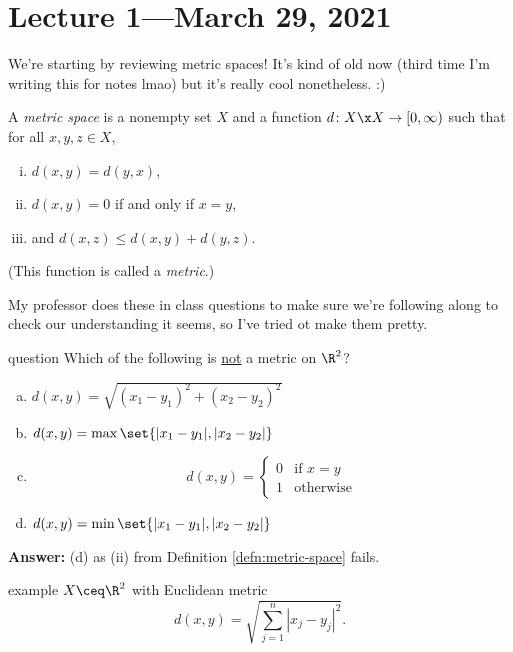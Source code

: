 \documentclass[class=article, crop=false]{standalone}
\begin{document}
\section{Lecture 1---March 29, 2021}

We're starting by reviewing metric spaces! It's kind of old now (third time I'm writing this for notes lmao) but it's really cool nonetheless. :)

\begin{defn}{\label{defn:metric-space}}
  A \emph{metric space} is a nonempty set $X$ and a function $d\colon X \x X \to [0,\infty)$ such that for all $x,y,z \in X$, \begin{enumerate}[(i)]
    \item $d(x,y) = d(y,x)$,
    \item $d(x,y) = 0$ if and only if $x=y$,
    \item and $d(x,z) \leq d(x,y)+d(y,z)$.
  \end{enumerate}
  (This function is called a \emph{metric}.)
\end{defn}

My professor does these in class questions to make sure we're following along to check our understanding it seems, so I've tried ot make them pretty.

\begin{understandingcheck}{question}
  Which of the following is \underline{not} a metric on $\R^2$? \begin{enumerate}[(a)]
    \item $d(x,y) = \sqrt{(x_1-y_1)^2+(x_2-y_2)^2}$
    \item $d(x,y) = \max \set{|x_1-y_1|,|x_2-y_2|}$
    \item
      \[
        d(x,y) = \begin{cases}
          0 & \text{if } x=y \\
          1 & \text{otherwise}
      \end{cases}
      \]
    \item $d(x,y) = \min \set{|x_1-y_1|, |x_2-y_2|}$
  \end{enumerate}

  \textbf{Answer:} (d) as (ii) from Definition \ref{defn:metric-space} fails.
\end{understandingcheck}

\begin{understandingcheck}{example}
  $X \ceq \R^2$ with Euclidean metric
    \[
      d(x,y) = \sqrt{\sum_{j=1}^{n} |x_j-y_j|^2}.
    \]
\end{understandingcheck}
\end{document}
